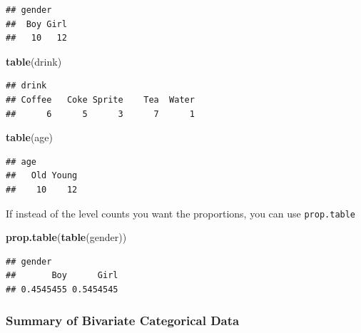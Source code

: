 \documentclass[]{book}
\newenvironment{Shaded}{\begin{snugshade}}{\end{snugshade}}
\newcommand{\CommentTok}[1]{\textcolor[rgb]{0.56,0.35,0.01}{\textit{#1}}}
\newcommand{\KeywordTok}[1]{\textcolor[rgb]{0.13,0.29,0.53}{\textbf{#1}}}
\newcommand{\NormalTok}[1]{#1}
\newcommand{\OperatorTok}[1]{\textcolor[rgb]{0.81,0.36,0.00}{\textbf{#1}}}
\newcommand{\StringTok}[1]{\textcolor[rgb]{0.31,0.60,0.02}{#1}}
\theoremstyle{definition}
\theoremstyle{definition}
\theoremstyle{definition}
\theoremstyle{remark}
\begin{document}
\begin{verbatim}
## gender
##  Boy Girl 
##   10   12
\end{verbatim}

\begin{Shaded}
\begin{Highlighting}[]
\KeywordTok{table}\NormalTok{(drink)}
\end{Highlighting}
\end{Shaded}

\begin{verbatim}
## drink
## Coffee   Coke Sprite    Tea  Water 
##      6      5      3      7      1
\end{verbatim}

\begin{Shaded}
\begin{Highlighting}[]
\KeywordTok{table}\NormalTok{(age)}
\end{Highlighting}
\end{Shaded}

\begin{verbatim}
## age
##   Old Young 
##    10    12
\end{verbatim}

If instead of the level counts you want the proportions, you can use \texttt{prop.table}

\begin{Shaded}
\begin{Highlighting}[]
\KeywordTok{prop.table}\NormalTok{(}\KeywordTok{table}\NormalTok{(gender))}
\end{Highlighting}
\end{Shaded}

\begin{verbatim}
## gender
##       Boy      Girl 
## 0.4545455 0.5454545
\end{verbatim}

\hypertarget{summary-of-bivariate-categorical-data}{%
\subsubsection{Summary of Bivariate Categorical Data}\label{summary-of-bivariate-categorical-data}}

\begin{Shaded}
\end{Shaded}
\end{document}
